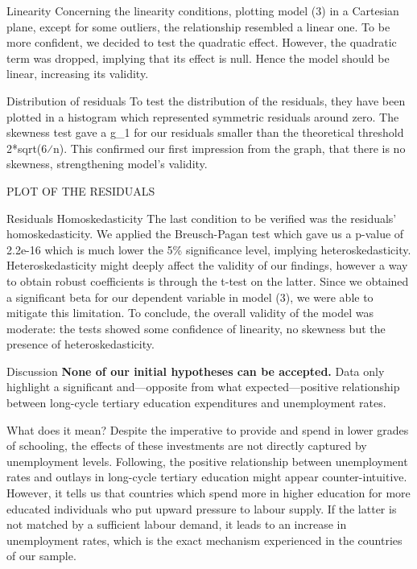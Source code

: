 \documentclass[
  ignorenonframetext,
]{beamer}
\begin{document}
\begin{frame}{Linearity}
\protect\hypertarget{linearity}{}
Concerning the linearity conditions, plotting model (3) in a Cartesian
plane, except for some outliers, the relationship resembled a linear
one. To be more confident, we decided to test the quadratic effect.
However, the quadratic term was dropped, implying that its effect is
null. Hence the model should be linear, increasing its validity.
\end{frame}

\begin{frame}{Distribution of residuals}
\protect\hypertarget{distribution-of-residuals}{}
To test the distribution of the residuals, they have been plotted in a
histogram which represented symmetric residuals around zero. The
skewness test gave a g\_1 for our residuals smaller than the theoretical
threshold 2*sqrt(6⁄n). This confirmed our first impression from the
graph, that there is no skewness, strengthening model's validity.

PLOT OF THE RESIDUALS
\end{frame}

\begin{frame}{Residuals Homoskedasticity}
\protect\hypertarget{residuals-homoskedasticity}{}
The last condition to be verified was the residuals' homoskedasticity.
We applied the Breusch-Pagan test which gave us a p-value of 2.2e-16
which is much lower the 5\% significance level, implying
heteroskedasticity. Heteroskedasticity might deeply affect the validity
of our findings, however a way to obtain robust coefficients is through
the t-test on the latter. Since we obtained a significant beta for our
dependent variable in model (3), we were able to mitigate this
limitation. To conclude, the overall validity of the model was moderate:
the tests showed some confidence of linearity, no skewness but the
presence of heteroskedasticity.
\end{frame}

\begin{frame}{Discussion}
\protect\hypertarget{discussion}{}
\textbf{None of our initial hypotheses can be accepted.} Data only
highlight a significant and---opposite from what expected---positive
relationship between long-cycle tertiary education expenditures and
unemployment rates.

\begin{block}{What does it mean?}
\protect\hypertarget{what-does-it-mean}{}
Despite the imperative to provide and spend in lower grades of
schooling, the effects of these investments are not directly captured by
unemployment levels. Following, the positive relationship between
unemployment rates and outlays in long-cycle tertiary education might
appear counter-intuitive. However, it tells us that countries which
spend more in higher education for more educated individuals who put
upward pressure to labour supply. If the latter is not matched by a
sufficient labour demand, it leads to an increase in unemployment rates,
which is the exact mechanism experienced in the countries of our sample.
\end{block}
\end{frame}
\end{document}
